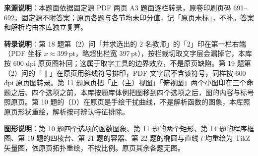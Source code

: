 


\begin{gktip}
\textbf{来源说明}：本题面依据固定源 PDF 两页 A3 题面逐栏转录，原卷印刷页码 691–692。固定源不附答案；原页各题与各节均未印分值，记「原页未标」，不补。答案和解析均由本库独立复算。

\textbf{转录说明}：第 18 题第（2）问「并求选出的 2 名教师」的「2」印在第一栏右端（PDF 坐标 $x\approx399\,\mathrm{pt}$，略超出栏宽 $397\,\mathrm{pt}$），按栏裁切取文字层会漏掉它，本库按 600 dpi 原页图补回；这属于取字工具的边界效应，不是原页缺陷。第 19 题第（2）问的「$\parallel$」在原页用斜线符号排印，PDF 文字层不含该符号，同样按 600 dpi 原页图转录。第 11 题原页把「正（主）视图」「俯视图」两个小图印在三个命题之后、四个选项之前，本库按题库体例把图移到四个选项之后，图的内容与标号照原页。第 10 题的（D）在原页是手绘干扰曲线，不是解析函数的图象，本库照原页形状重绘，解析按可辨认特征排除。

\textbf{图形说明}：第 10 题四个选项的函数图象、第 11 题的两个矩形、第 14 题的程序框图、第 19 题的四棱台、第 21 题的容器、第 22 题的椭圆与直线 $l$ 均重绘为 TikZ 矢量图，依原页拓扑重绘，不按比例。原页其余各题无图。
\end{gktip}


